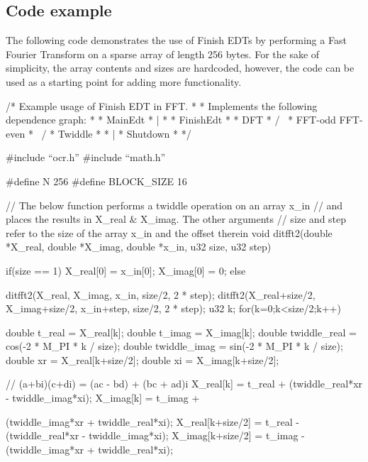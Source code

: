 \subsection{Code example}

The following code demonstrates the use of Finish EDTs by performing a Fast Fourier
Transform on a sparse array of length 256 bytes. For the sake of simplicity, the
array contents and sizes are hardcoded, however, the code can be used as a starting
point for adding more functionality.

\begin{ocrsnip}


/* Example usage of Finish EDT in FFT.
 *
 * Implements the following dependence graph:
 *
 * MainEdt
 *    |
 *
 * FinishEdt
 * {
 *       DFT
 *      /   \
 * FFT-odd FFT-even
 *      \   /
 *     Twiddle
 * }
 *    |
 * Shutdown
 *
 */

#include ``ocr.h''
#include ``math.h''

#define N          256
#define BLOCK_SIZE 16

// The below function performs a twiddle operation on an array x_in
// and places the results in X_real & X_imag. The other arguments
// size and step refer to the size of the array x_in and the offset therein
void ditfft2(double *X_real, double *X_imag, double *x_in, u32 size, u32 step) {
    if(size == 1) {
        X_real[0] = x_in[0];
        X_imag[0] = 0;
    } else {
        ditfft2(X_real, X_imag, x_in, size/2, 2 * step);
        ditfft2(X_real+size/2, X_imag+size/2, x_in+step, size/2, 2 * step);
        u32 k;
        for(k=0;k<size/2;k++) {
            double t_real = X_real[k];
            double t_imag = X_imag[k];
            double twiddle_real = cos(-2 * M_PI * k / size);
            double twiddle_imag = sin(-2 * M_PI * k / size);
            double xr = X_real[k+size/2];
            double xi = X_imag[k+size/2];

            // (a+bi)(c+di) = (ac - bd) + (bc + ad)i
            X_real[k] = t_real +
                (twiddle_real*xr - twiddle_imag*xi);
            X_imag[k] = t_imag +

                (twiddle_imag*xr + twiddle_real*xi);
            X_real[k+size/2] = t_real -
                (twiddle_real*xr - twiddle_imag*xi);
            X_imag[k+size/2] = t_imag -
                (twiddle_imag*xr + twiddle_real*xi);
        }
    }
}


\end{ocrsnip}
